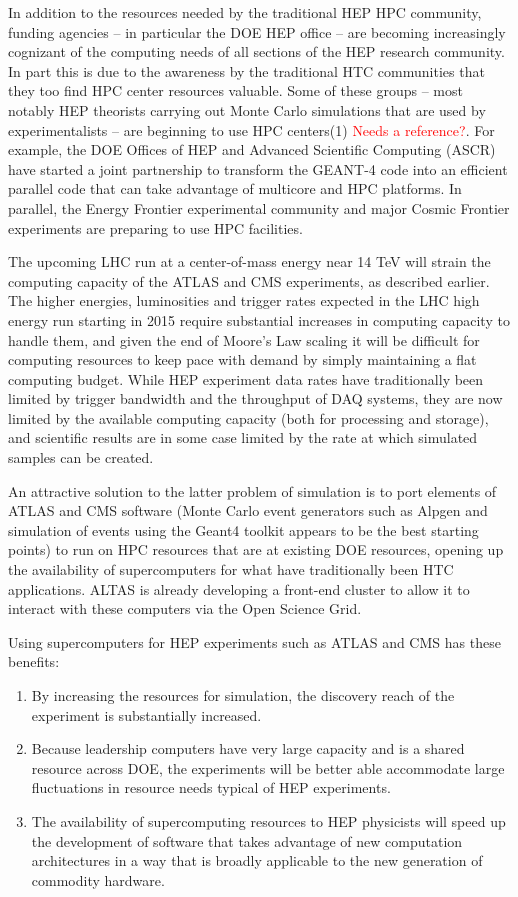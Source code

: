 In addition to the resources needed by the traditional HEP HPC community, funding agencies 
-- in particular the DOE HEP office -- are becoming increasingly cognizant of the computing 
needs of all sections of the HEP research community. In part this is due to the awareness 
by the traditional HTC communities that they too find HPC center resources valuable. 
Some of these groups -- most notably HEP theorists carrying out Monte Carlo simulations that 
are used by experimentalists -- are beginning to use HPC centers(1) \textcolor{red}{Needs a reference?}. 
For example, the DOE Offices of HEP and Advanced Scientific Computing (ASCR) have started a joint partnership to transform the GEANT-4 code into an efficient parallel code that can take advantage of multicore and HPC platforms. In parallel, the Energy Frontier experimental community and major Cosmic Frontier experiments are preparing to use HPC facilities.
 
The upcoming LHC run at a center-of-mass energy near 14 TeV will strain the computing capacity of the ATLAS and CMS experiments, as described earlier. The higher energies, luminosities and trigger rates expected in the LHC high energy run starting in 2015 require substantial increases in computing capacity to handle them, and given the end of Moore's Law scaling it will be difficult for computing resources to keep pace with demand by simply maintaining a flat computing budget.  While HEP experiment data rates have traditionally been limited by trigger bandwidth and the throughput of DAQ systems, they are now limited by the available computing capacity (both for processing and storage), and scientific results are in some case limited by the rate at which simulated samples can be created.

An attractive solution to the latter problem of simulation is to port elements of ATLAS and CMS software (Monte Carlo event generators such as Alpgen and simulation of events using the Geant4 toolkit appears to be the best starting points) to run on HPC resources that are at existing DOE resources, opening up the availability of supercomputers for what have traditionally been HTC applications.  ALTAS is already developing a front-end cluster to allow it to interact with these computers via the Open Science Grid.
 
Using supercomputers for HEP experiments such as ATLAS and CMS has these benefits:
\begin{enumerate} 
\item{By increasing the resources for simulation, the discovery reach of the experiment is substantially increased.}
\item{Because leadership computers have very large capacity and is a shared resource across DOE, the experiments will be better able accommodate large fluctuations in resource needs typical of HEP experiments.}
\item{The availability of supercomputing resources to HEP physicists will speed up the development of software that takes advantage of new computation architectures in a way that is broadly applicable to the new generation of commodity hardware.}
\end{enumerate}
 
